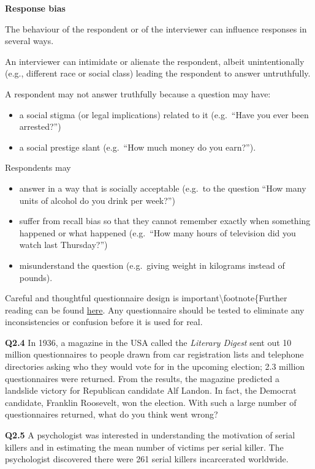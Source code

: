 \documentclass[
  oneside]{krantz}
\begin{document}
\textbf{Response bias}

The behaviour of the respondent or of the interviewer can influence responses in several ways.

An interviewer can intimidate or alienate the respondent, albeit unintentionally (e.g., different race or social class) leading the respondent to answer untruthfully.

A respondent may not answer truthfully because a question may have:

\begin{itemize}
\item
  a social stigma (or legal implications) related to it (e.g.~``Have you ever been arrested?'')
\item
  a social prestige slant (e.g.~``How much money do you earn?'').
\end{itemize}

Respondents may

\begin{itemize}
\item
  answer in a way that is socially acceptable (e.g.~to the question ``How many units of alcohol do you drink per week?'')
\item
  suffer from recall bias so that they cannot remember exactly when something happened or what happened (e.g.~``How many hours of television did you watch last Thursday?'')
\item
  misunderstand the question (e.g.~giving weight in kilograms instead of pounds).
\end{itemize}

Careful and thoughtful questionnaire design is important\textbackslash footnote\{Further reading can be found \href{https://www.pewresearch.org/methods/u-s-survey-research/questionnaire-design/}{here}. Any questionnaire should be tested to eliminate any inconsistencies or confusion before it is used for real.

\textbf{Q2.4} In 1936, a magazine in the USA called the \textit{Literary Digest} sent out 10 million questionnaires to people drawn from car registration lists and telephone directories asking who they would vote for in the upcoming election; 2.3 million questionnaires were returned. From the results, the magazine predicted a landslide victory for Republican candidate Alf Landon. In fact, the Democrat candidate, Franklin Roosevelt, won the election. With such a large number of questionnaires returned, what do you think went wrong?

\textbf{Q2.5} A psychologist was interested in understanding the motivation of serial killers and in estimating the mean number of victims per serial killer. The psychologist discovered there were 261 serial killers incarcerated worldwide.
\end{document}
